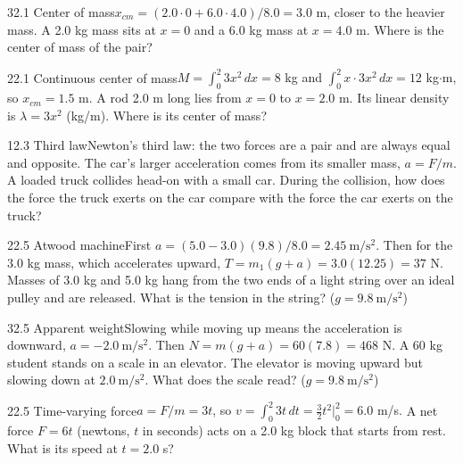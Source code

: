 \documentclass[11pt]{article}
\begin{document}
\begin{q}{3}{2.1 Center of mass}{$x_{cm} = (2.0 \cdot 0 + 6.0 \cdot 4.0)/8.0 = 3.0$ m, closer to the heavier mass.}
A 2.0 kg mass sits at $x = 0$ and a 6.0 kg mass at $x = 4.0$ m. Where is the center of mass of the pair?
\end{q}
\begin{q}{2}{2.1 Continuous center of mass}{$M = \int_0^2 3x^2\,dx = 8$ kg and $\int_0^2 x\cdot 3x^2\,dx = 12$ kg$\cdot$m, so $x_{cm} = 1.5$ m.}
A rod 2.0 m long lies from $x = 0$ to $x = 2.0$ m. Its linear density is $\lambda = 3x^2$ (kg/m). Where is its center of mass?
\end{q}
\begin{q}{1}{2.3 Third law}{Newton's third law: the two forces are a pair and are always equal and opposite. The car's larger acceleration comes from its smaller mass, $a = F/m$.}
A loaded truck collides head-on with a small car. During the collision, how does the force the truck exerts on the car compare with the force the car exerts on the truck?
\end{q}
\begin{q}{2}{2.5 Atwood machine}{First $a = (5.0 - 3.0)(9.8)/8.0 = 2.45\ \mathrm{m/s^2}$. Then for the 3.0 kg mass, which accelerates upward, $T = m_1(g + a) = 3.0(12.25) = 37$ N.}
Masses of 3.0 kg and 5.0 kg hang from the two ends of a light string over an ideal pulley and are released. What is the tension in the string? ($g = 9.8\ \mathrm{m/s^2}$)
\end{q}
\begin{q}{3}{2.5 Apparent weight}{Slowing while moving up means the acceleration is downward, $a = -2.0\ \mathrm{m/s^2}$. Then $N = m(g + a) = 60(7.8) = 468$ N.}
A 60 kg student stands on a scale in an elevator. The elevator is moving upward but slowing down at $2.0\ \mathrm{m/s^2}$. What does the scale read? ($g = 9.8\ \mathrm{m/s^2}$)
\end{q}
\begin{q}{2}{2.5 Time-varying force}{$a = F/m = 3t$, so $v = \int_0^2 3t\,dt = \tfrac32 t^2\big|_0^2 = 6.0$ m/s.}
A net force $F = 6t$ (newtons, $t$ in seconds) acts on a 2.0 kg block that starts from rest. What is its speed at $t = 2.0$ s?
\end{q}
\end{document}
